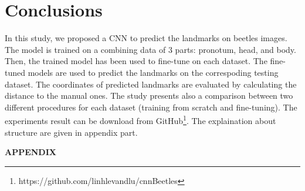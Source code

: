 \documentclass[12pt,a4paper]{article}
\begin{document}
\section{Conclusions}
In this study, we proposed a CNN to predict the landmarks on beetles images. The model is trained on a combining data of $3$ parts: pronotum, head, and body. Then, the trained model has been used to fine-tune on each dataset. The fine-tuned models are used to predict the landmarks on the correspoding testing dataset. The coordinates of predicted landmarks are evaluated by calculating the distance to the manual ones. The study presents also a comparison between two different procedures for each dataset (training from scratch and fine-tuning). The experiments result can be download from GitHub\footnote{https://github.com/linhlevandlu/cnnBeetles}. The explaination about structure are given in appendix part.


\pagebreak
\appendix
\begin{center}
\textbf{\LARGE{APPENDIX}}
\end{center}
\end{document}
